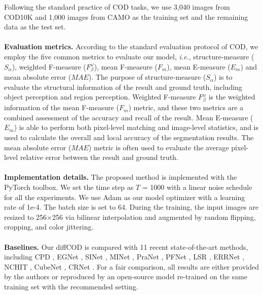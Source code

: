 \documentclass{ecai}
\begin{document}
Following the standard practice of COD tasks, we use 3,040  images from COD10K and 1,000 images from CAMO as the training set and the remaining data as the test set.
\\ \hspace*{\fill} \\
\noindent\textbf{Evaluation metrics.} 
According to the standard evaluation protocol of COD, we employ the five common metrics to evaluate our model, \textit{i.e.}, 
structure-measure ($S_{\alpha}$), weighted F-measure ($F_{\beta}^{\omega}$), mean F-measure ($F_{m}$), mean E-measure ($E_{m}$) and mean absolute error ($MAE$).
The purpose of structure-measure ($S_{\alpha}$) is to evaluate the structural information of the result and ground truth, including object perception and region perception. Weighted F-measure $F_{\beta}^{\omega}$ is the weighted information of the mean F-measure ($F_{m}$) metric, and these two metrics are a combined assessment of the accuracy and recall of the result. Mean E-measure ($E_{m}$) is able to perform both pixel-level matching and image-level statistics, and is used to calculate the overall and local accuracy of the segmentation results. The mean absolute error ($MAE$) metric is often used to evaluate the average pixel-level relative error between the result and ground truth.
\\ \hspace*{\fill} \\
\noindent\textbf{Implementation details.}
The proposed method is implemented with the PyTorch toolbox. 
We set the time step as $T$ = 1000 with a linear noise schedule for all the experiments.
We use Adam as our model optimizer with a learning rate of 1e-4. The batch size is set to 64.
During the training, the input images are resized to 256$\times$256 via bilinear interpolation and augmented by random flipping, cropping, and color jittering.
\\ \hspace*{\fill} \\
\noindent\textbf{Baselines.} 
Our diffCOD is compared with 11 recent state-of-the-art methods, including CPD \cite{wu2019cascaded}, EGNet \cite{Zhao_2019_ICCV}, SINet \cite{fan2020camouflaged}, MINet \cite{pang2020multi}, PraNet \cite{fan2020pranet}, PFNet \cite{mei2021camouflaged}, LSR \cite{lv2021simultaneously}, ERRNet \cite{ji2022fast}, NCHIT \cite{zhang2022camouflaged}, CubeNet \cite{zhuge2022cubenet}, CRNet \cite{he2022weakly}. For a fair comparison, all results are either provided by the authors or reproduced by an open-source model re-trained on the same training set with the recommended setting.
\end{document}
